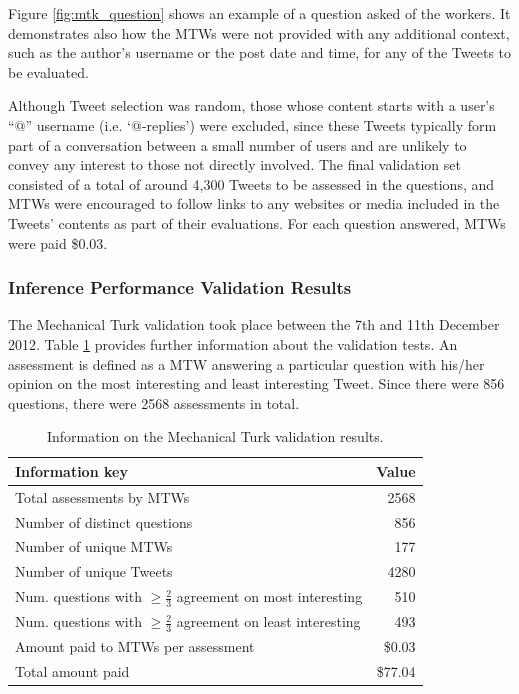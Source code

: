 Figure \ref{fig:mtk_question} shows an example of a question asked of the workers. It demonstrates also how the MTWs were not provided with any additional context, such as the author's username or the post date and time, for any of the Tweets to be evaluated.

Although Tweet selection was random, those whose content starts with a user's ``@'' username (i.e. `@-replies') were excluded, since these Tweets typically form part of a conversation between a small number of users and are unlikely to convey any interest to those not directly involved. The final validation set consisted of a total of around 4,300 Tweets to be assessed in the questions, and MTWs were encouraged to follow links to any websites or media included in the Tweets' contents as part of their evaluations. For each question answered, MTWs were paid \$0.03. 


\subsubsection{Inference Performance Validation Results}
\label{section:initial_inference_results}
The Mechanical Turk validation took place between the 7th and 11th December 2012. Table \ref{table:mtk_data_1} provides further information about the validation tests. An assessment is defined as a MTW answering a particular question with his/her opinion on the most interesting and least interesting Tweet. Since there were 856 questions, there were 2568 assessments in total.

\begin{table}[h]\footnotesize
\begin{center}
\begin{tabular}{ l || r }
     Information key & Value\\
     \hline
     \hline
	 Total assessments by MTWs & 2568\\
	 Number of distinct questions & 856\\
	 Number of unique MTWs & 177\\
	 Number of unique Tweets & 4280\\
	 \hline
	 Num. questions with $\geq \frac{2}{3}$ agreement on most interesting & 510\\
	 Num. questions with $\geq \frac{2}{3}$ agreement on least interesting & 493\\
	 \hline
	 Amount paid to MTWs per assessment & \$0.03\\
	 Total amount paid & \$77.04\\
     \hline
\end{tabular}
\end{center}
\caption{Information on the Mechanical Turk validation results.}
\label{table:mtk_data_1}
\end{table}


